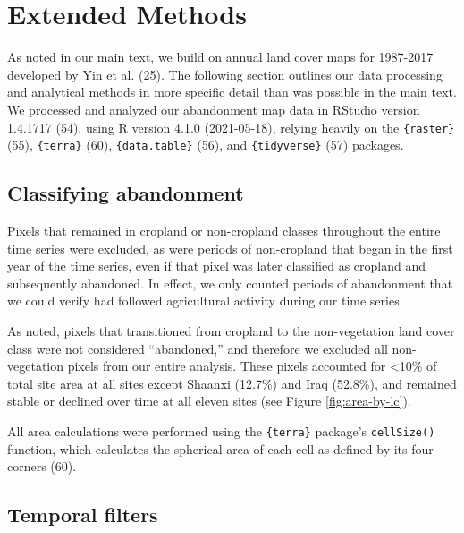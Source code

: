 \documentclass[9pt,twocolumn,twoside,lineno]{pnas-new}
\begin{document}
\hypertarget{methods-si}{%
\section{Extended Methods}\label{methods-si}}

As noted in our main text, we build on annual land cover maps for 1987-2017 developed by Yin et al. (25).
The following section outlines our data processing and analytical methods in more specific detail than was possible in the main text.
We processed and analyzed our abandonment map data in RStudio version 1.4.1717 (54), using R version 4.1.0 (2021-05-18), relying heavily on the \texttt{\{raster\}} (55), \texttt{\{terra\}} (60), \texttt{\{data.table\}} (56), and \texttt{\{tidyverse\}} (57) packages.

\hypertarget{classifying-abandonment}{%
\subsection{Classifying abandonment}\label{classifying-abandonment}}

Pixels that remained in cropland or non-cropland classes throughout the entire time series were excluded, as were periods of non-cropland that began in the first year of the time series, even if that pixel was later classified as cropland and subsequently abandoned.
In effect, we only counted periods of abandonment that we could verify had followed agricultural activity during our time series.

As noted, pixels that transitioned from cropland to the non-vegetation land cover class were not considered ``abandoned,'' and therefore we excluded all non-vegetation pixels from our entire analysis.
These pixels accounted for \textless10\% of total site area at all sites except Shaanxi (12.7\%) and Iraq (52.8\%), and remained stable or declined over time at all eleven sites (see Figure \ref{fig:area-by-lc}).

All area calculations were performed using the \texttt{\{terra\}} package's \texttt{cellSize()} function, which calculates the spherical area of each cell as defined by its four corners (60).

\hypertarget{temporal-filters}{%
\subsection{Temporal filters}\label{temporal-filters}}
\end{document}
